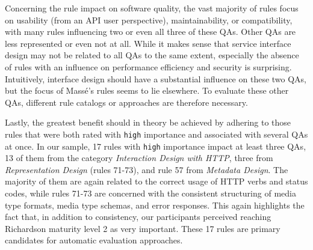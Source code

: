 \documentclass[runningheads]{llncs}
\begin{document}
Concerning the rule impact on software quality, the vast majority of rules focus on usability (from an API user perspective), maintainability, or compatibility, with many rules influencing two or even all three of these QAs.
Other QAs are less represented or even not at all.
While it makes sense that service interface design may not be related to all QAs to the same extent, especially the absence of rules with an influence on performance efficiency and security is surprising.
Intuitively, interface design should have a substantial influence on these two QAs, but the focus of Massé's rules seems to lie elsewhere.
To evaluate these other QAs, different rule catalogs or approaches are therefore necessary.

Lastly, the greatest benefit should in theory be achieved by adhering to those rules that were both rated with \texttt{high} importance and associated with several QAs at once.
In our sample, 17 rules with \texttt{high} importance impact at least three QAs, 13 of them from the category \textit{Interaction Design with HTTP}, three from \textit{Representation Design} (rules 71-73), and rule 57 from \textit{Metadata Design}.
The majority of them are again related to the correct usage of HTTP verbs and status codes, while rules 71-73 are concerned with the consistent structuring of media type formats, media type schemas, and error responses.
This again highlights the fact that, in addition to consistency, our participants perceived reaching Richardson maturity level 2 as very important.
These 17 rules are primary candidates for automatic evaluation approaches.
\end{document}
